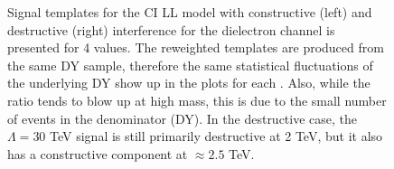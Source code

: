 {\begin{figure}[tb]
\begin{center}
\caption{Signal templates for the CI LL model with constructive (left) and destructive (right) interference for the  dielectron channel is presented for 4 \lam values. The reweighted templates are produced from the same DY sample, therefore the same statistical fluctuations of the underlying DY show up in the plots for each \lam. Also, while the ratio tends to blow up at high mass, this is due to the small number of events in the denominator (DY). In the destructive case, the $\Lambda=30$ TeV signal is still primarily destructive at 2 TeV, but it also has a constructive component at $\approx2.5$ TeV.}
\label{fig:ciSignalRatiosToNominal}
\end{center}
\end{figure}
\clearpage
}
